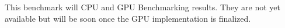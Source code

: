 This benchmark will CPU and GPU Benchmarking results. They are not yet available but will be soon once the GPU implementation is finalized.

% 
% 
% 
% 


